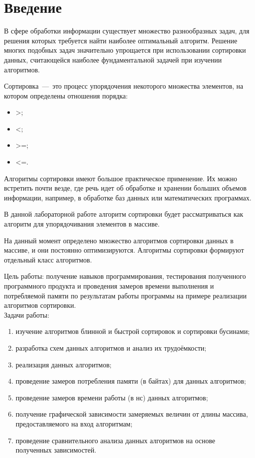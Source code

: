 \setcounter{page}{3}
\chapter*{Введение}
В сфере обработки информации существует множество разнообразных задач, для решения которых требуется найти наиболее оптимальный алгоритм. Решение многих подобных задач значительно упрощается при использовании сортировки данных, считающейся наиболее фундаментальной задачей при изучении алгоритмов.

Сортировка~---~это процесс упорядочения некоторого множества элементов, на котором определены отношения порядка:
\begin{itemize}
	\item >;
	\item <;
	\item >=;
	\item <=.
\end{itemize}

Алгоритмы сортировки имеют большое практическое применение. Их можно встретить почти везде, где речь идет об обработке и хранении больших объемов информации, например, в обработке баз данных или математических программах.

В данной лабораторной работе алгоритм сортировки будет рассматриваться как алгоритм для упорядочивания элементов в массиве. 

На данный момент определено множество алгоритмов сортировки данных в массиве, и они  постоянно оптимизируются. Алгоритмы сортировки формируют отдельный класс алгоритмов.

Цель работы: получение навыков программирования, тестирования полученного программного продукта и проведения замеров времени выполнения и потребляемой памяти по результатам работы программы на примере реализации алгоритмов сортировки.\\

Задачи работы:
\begin{enumerate}[label={\arabic*)}]
	\item изучение алгоритмов блинной и быстрой сортировок и сортировки бусинами;
	\item разработка схем данных алгоритмов и анализ их трудоёмкости;
	\item реализация данных алгоритмов;
	\item проведение замеров потребления памяти (в байтах) для данных алгоритмов; 
	\item проведение замеров времени работы (в нс) данных алгоритмов; 
	\item получение графической зависимости замеряемых величин от длины массива, предоставляемого на вход алгоритмам;
	\item проведение сравнительного анализа данных алгоритмов на основе полученных зависимостей.
\end{enumerate}

\newpage